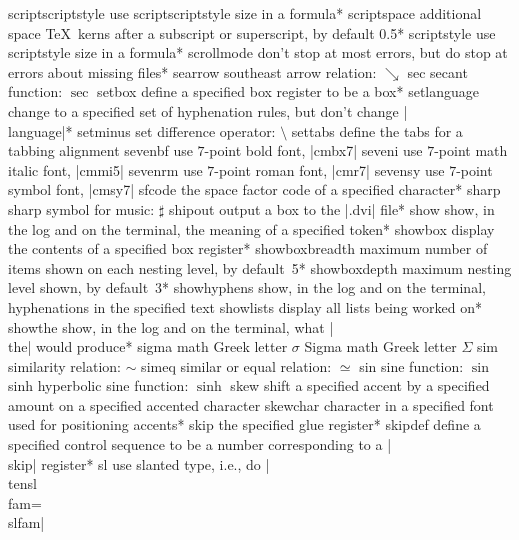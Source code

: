 \capcs scriptscriptstyle {use scriptscriptstyle size in a formula}*{}
\capcs scriptspace {additional space \TeX\ kerns after a subscript or
   superscript, by default 0.5\pt}*{}
\capcs scriptstyle {use scriptstyle size in a formula}*{}
\capcs scrollmode {don't stop at most errors, but do stop at errors
   about missing files}*{}
\capcs searrow {southeast arrow relation: $\searrow$}{}{}
\capcs sec {secant function: $\sec$}{}{}
\capcs setbox {define a specified box register to be a box}*{}
\capcs setlanguage {change to a specified set of hyphenation rules, but
   don't change |\\language|}{*}{}
\capcs setminus {set difference operator: $\setminus$}{}{}
\capcs settabs {define the tabs for a tabbing alignment}{}{}
\capcs sevenbf {use $7$-point bold font, |cmbx7|}{}{}
\capcs seveni {use $7$-point math italic font, |cmmi5|}{}{}
\capcs sevenrm {use $7$-point roman font, |cmr7|}{}{}
\capcs sevensy {use $7$-point symbol font, |cmsy7|}{}{}
\capcs sfcode {the space factor code of a specified character}*{}
\capcs sharp {sharp symbol for music: $\sharp$}{}{}
\capcs shipout {output a box to the |.dvi| file}*{}
\capcs show {show, in the log and 
   on the terminal, the meaning of a specified token}*{}
\capcs showbox {display the contents of a specified box register}*{}
\capcs showboxbreadth {maximum number of items shown on each nesting
   level, by default~5}*{}
\capcs showboxdepth {maximum nesting level shown, by default~3}*{}
\capcs showhyphens {show, in the log
   and on the terminal, hyphenations in the specified text}{}{}
\capcs showlists {display all lists being worked on}*{}
\capcs showthe {show, in the log 
   and on the terminal, what |\\the| would produce}*{}
\capcs sigma {math Greek letter $\sigma$}{}{}
\capcs Sigma {math Greek letter $\Sigma$}{}{}
\capcs sim {similarity relation: $\sim$}{}{}
\capcs simeq {similar or equal relation: $\simeq$}{}{}
\capcs sin {sine function: $\sin$}{}{}
\capcs sinh {hyperbolic sine function: $\sinh$}{}{}
\capcs skew {shift a specified accent by a specified amount
   on a specified accented character}{}{}
\capcs skewchar {character in a specified font used for positioning accents}*{}
\capcs skip {the specified glue register}*{}
\capcs skipdef {define a specified control sequence to be a number
   corresponding to a |\\skip| register}*{}
\capcs sl {use slanted type, i.e., do |\\tensl\\fam=\\slfam|}{}{}
